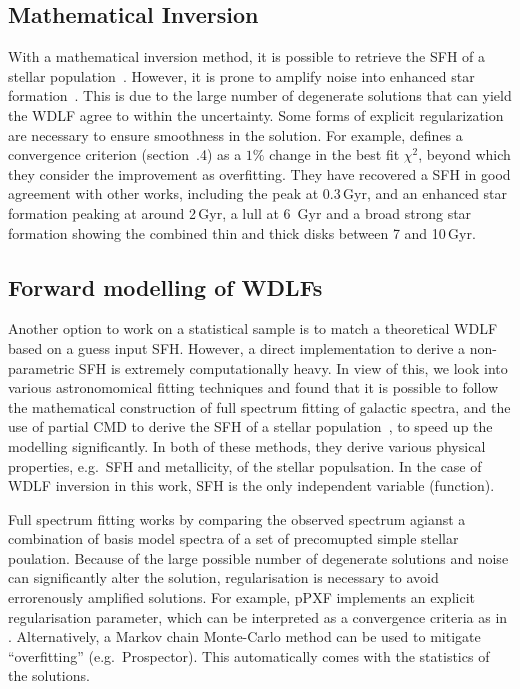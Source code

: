 \documentclass[fleqn,usenatbib]{mnras}
\begin{document}
\subsection{Mathematical Inversion}
With a mathematical inversion method, it is possible to retrieve the SFH of a
stellar population~\citep{2013MNRAS.434.1549R}. However, it is prone to amplify
noise into enhanced star formation~\citep{2014ApJ...791...92T}. This is due to
the large number of degenerate solutions that can yield the WDLF agree to
within the uncertainty. Some forms of explicit regularization are necessary
to ensure smoothness in the solution. For example, \citet{2013MNRAS.434.1549R}
defines a convergence criterion (section~.4)
as a $1\%$ change in the best fit $\chi^2$, beyond which they consider the
improvement as overfitting. They have recovered a SFH in good agreement 
with other works, including the peak at 0.3\,Gyr, and an enhanced star 
formation peaking at around 2\,Gyr, a lull at 6 \,Gyr and a broad strong star 
formation showing the combined thin and thick disks between 7 and 10\,Gyr.

\subsection{Forward modelling of WDLFs}
Another option to work on a statistical sample is to match a theoretical
WDLF based on a guess input SFH. However, a direct implementation to derive a
non-parametric SFH is extremely computationally heavy. In view of this, we look
into various astronomomical fitting techniques and found that it is possible to
follow the mathematical construction of full spectrum fitting of galactic
spectra, and the use of partial CMD to derive the SFH of a stellar
population~\citep{2006A&A...459..783C}, to speed up the modelling significantly.
In both of these methods, they derive various physical properties, e.g.\ SFH and
metallicity, of the stellar populsation. In the case of WDLF inversion in this
work, SFH is the only independent variable (function).

Full spectrum fitting works by comparing the observed spectrum agianst a
combination of basis model spectra of a set of precomupted simple stellar
poulation. Because of the large possible number of degenerate solutions and
noise can significantly alter the solution, regularisation is necessary to
avoid errorenously amplified solutions. For example, pPXF implements an explicit
regularisation parameter, which can be interpreted as a convergence criteria as
in \citet{2013MNRAS.434.1549R}. Alternatively, a Markov chain Monte-Carlo method
can be used to mitigate ``overfitting'' (e.g.\ Prospector). This automatically
comes with the statistics of the solutions.
\end{document}

